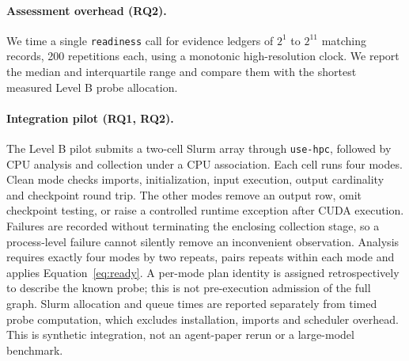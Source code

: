 \documentclass[pdflatex,sn-mathphys-num]{sn-jnl}
\theoremstyle{thmstylethree}
\newcommand{\upstream}{\texttt{use-hpc}}
\newcommand{\code}[1]{\texttt{#1}}
\newcommand{\OverheadRepeats}{200}
\begin{document}
\paragraph{Assessment overhead (RQ2).} We time a single \code{readiness} call for evidence ledgers of $2^1$ to $2^{11}$ matching records, \OverheadRepeats{} repetitions each, using a monotonic high-resolution clock. We report the median and interquartile range and compare them with the shortest measured Level B probe allocation.

\paragraph{Integration pilot (RQ1, RQ2).} The Level B pilot submits a two-cell Slurm array through \upstream{}, followed by CPU analysis and collection under a CPU association. Each cell runs four modes. Clean mode checks imports, initialization, input execution, output cardinality and checkpoint round trip. The other modes remove an output row, omit checkpoint testing, or raise a controlled runtime exception after CUDA execution. Failures are recorded without terminating the enclosing collection stage, so a process-level failure cannot silently remove an inconvenient observation. Analysis requires exactly four modes by two repeats, pairs repeats within each mode and applies Equation~\eqref{eq:ready}. A per-mode plan identity is assigned retrospectively to describe the known probe; this is not pre-execution admission of the full graph. Slurm allocation and queue times are reported separately from timed probe computation, which excludes installation, imports and scheduler overhead. This is synthetic integration, not an agent-paper rerun or a large-model benchmark.
\end{document}
